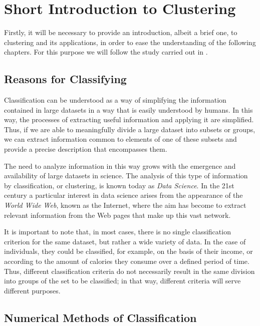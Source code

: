 
\chapter{Short Introduction to Clustering}\label{ch:IntroClustering}

Firstly, it will be necessary to provide an introduction, albeit a brief one, to clustering and its applications, in order to ease the understanding of the following chapters. For this purpose we will follow the study carried out in \cite{Everitt:2009:CA:1538772}.

\section{Reasons for Classifying}

Classification can be understood as a way of simplifying the information contained in large datasets in a way that is easily understood by humans. In this way, the processes of extracting useful information and applying it are simplified. Thus, if we are able to meaningfully divide a large dataset into subsets or groups, we can extract information common to elements of one of these subsets and provide a precise description that encompasses them.

The need to analyze information in this way grows with the emergence and availability of large datasets in science. The analysis of this type of information by classification, or clustering, is known today as \textit{Data Science}. In the 21st century a particular interest in data science arises from the appearance of the \textit{World Wide Web}, known as the Internet, where the aim has become to extract relevant information from the Web pages that make up this vast network.

It is important to note that, in most cases, there is no single classification criterion for the same dataset, but rather a wide variety of data. In the case of individuals, they could be classified, for example, on the basis of their income, or according to the amount of calories they consume over a defined period of time. Thus, different classification criteria do not necessarily result in the same division into groups of the set to be classified; in that way, different criteria will serve different purposes.

\section{Numerical Methods of Classification}

